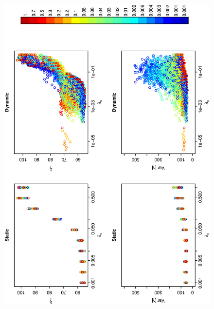 \documentclass[12pt]{article}
\begin{document}
\begin{figure}[hb!]
\hspace{-0.5 in}\includegraphics[width=5in,angle=-90]{./figures/radius_vs_gamma.eps}
\caption{}
\label{fig:Figure6}
\end{figure}
\end{document}
